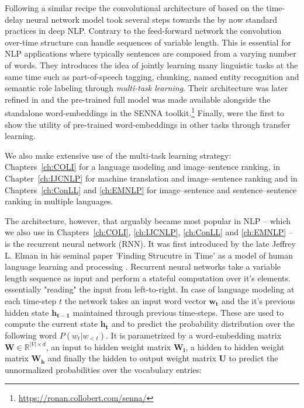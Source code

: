 Following a similar recipe the convolutional architecture of \cite{collobert2008unified}
based on the time-delay neural network model \citep{waibel1990phoneme} took several steps towards the
by now standard practices in deep NLP.
Contrary to the feed-forward network the convolution over-time structure can handle
sequences of variable length. This is essential for NLP applications where typically sentences
are composed from a varying number of words.
They introduces the idea of jointly learning many linguistic tasks at the same time such as part-of-speech
tagging, chunking, named entity recognition and semantic role labeling through \emph{multi-task learning}.
Their architecture was later refined in \cite{collobert2011natural} and the pre-trained
full model was made available alongside the standalone word-embeddings in the SENNA toolkit.\footnote{\url{https://ronan.collobert.com/senna/}}
Finally, \cite{collobert2008unified} were the first to show the utility of pre-trained word-embeddings
in other tasks through transfer learning.

We also make extensive use of the multi-task learning strategy:  Chapters~\ref{ch:COLI} for
a language modeling and image--sentence ranking, in Chapter~\ref{ch:IJCNLP} for machine translation
and image--sentence ranking and in Chapters~\ref{ch:ConLL} and \ref{ch:EMNLP} for image--sentence
and sentence--sentence ranking in multiple languages.


The architecture, however, that arguably became most popular in NLP -- which we also use in
Chapters~\ref{ch:COLI}, \ref{ch:IJCNLP}, \ref{ch:ConLL} and \ref{ch:EMNLP} --
is the recurrent neural network (RNN). It was 
first introduced by the late Jeffrey L. Elman in his seminal paper  'Finding Strucutre in Time'
as a model of human language learning and processing \citep{elman1990finding}. Recurrent neural networks
take a variable length sequence as input and perform a stateful computation over it's elements.
essentially "reading" the input from left-to-right.
In case of language modeling at each time-step $t$ the network takes an input word vector $\mathbf{w_t}$
and the it's previous hidden state $\mathbf{h_{t-1}}$ maintained through previous 
time-steps. These are used to compute the current
state $\mathbf{h_t}$ and to predict the probability distribution over the following word $P(w_t|w_{<t})$.
It is parametrized by a word-embedding matrix $\mathbf{W} \in \mathbb{R}^{|V| \times d}$, 
an input to hidden weight matrix $\mathbf{W_i}$, a hidden to hidden weight 
matrix $\mathbf{W_h}$ and finally the hidden to output
weight matrix $\mathbf{U}$ to predict the unnormalized probabilities over the vocabulary entries:

